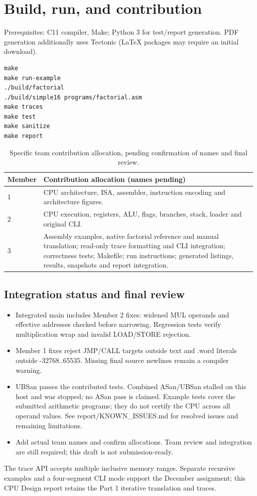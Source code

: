 \documentclass[10pt]{article}
\begin{document}
\section*{Build, run, and contribution}
Prerequisites: C11 compiler, Make; Python 3 for test/report generation.
PDF generation additionally uses Tectonic (LaTeX packages may require an initial download).
\begin{Verbatim}[fontsize=\small]
make
make run-example
./build/factorial
./build/simple16 programs/factorial.asm
make traces
make test
make sanitize
make report
\end{Verbatim}
\begin{table}[h]\centering
\begin{tabular}{lp{.72\linewidth}}\toprule
Member & Contribution allocation (names pending)\\\midrule
1 & CPU architecture, ISA, assembler, instruction encoding and architecture figures.\\
2 & CPU execution, registers, ALU, flags, branches, stack, loader and original CLI.\\
3 & Assembly examples, native factorial reference and manual translation; read-only trace formatting and CLI integration; correctness tests; Makefile; run instructions; generated listings, results, snapshots and report integration.\\\bottomrule
\end{tabular}\caption{Specific team contribution allocation, pending confirmation of names and final review.}
\end{table}
\subsection*{Integration status and final review}
\begin{itemize}
\item Integrated main includes Member 2 fixes: widened MUL operands and effective addresses checked before narrowing. Regression tests verify multiplication wrap and invalid LOAD/STORE rejection.
\item Member 1 fixes reject JMP/CALL targets outside text and .word literals outside -32768..65535. Missing final source newlines remain a compiler warning.
\item UBSan passes the contributed tests. Combined ASan/UBSan stalled on this host and was stopped; no ASan pass is claimed. Example tests cover the submitted arithmetic programs; they do not certify the CPU across all operand values. See report/KNOWN\_ISSUES.md for resolved issues and remaining limitations.
\item Add actual team names and confirm allocations. Team review and integration are still required; this draft is not submission-ready.
\end{itemize}
The trace API accepts multiple inclusive memory ranges. Separate recursive examples and a four-segment CLI mode support the December assignment; this CPU Design report retains the Part 1 iterative translation and traces.
\end{document}
